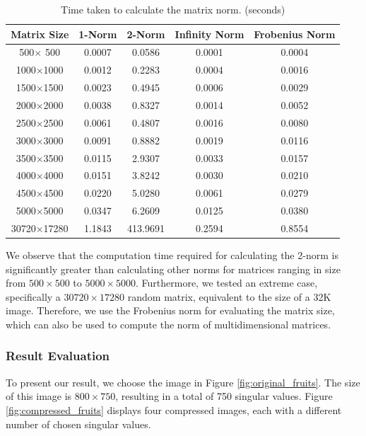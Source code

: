 \documentclass[12pt]{article}
\theoremstyle{definition}
\begin{document}
\begin{table}[ht]
    \centering
    \begin{tabular}{c@{\hspace{0.5cm}}||@{\hspace{0.4cm}}c@{\hspace{0.8cm}}c@{\hspace{0.5cm}}cc}
        \toprule
        Matrix Size & 1-Norm & 2-Norm & Infinity Norm & Frobenius Norm \\
        \midrule 
         500$\times$ 500 & 0.0007 & 0.0586 & 0.0001 & 0.0004 \\
        1000$\times$1000 & 0.0012 & 0.2283 & 0.0004 & 0.0016 \\
        1500$\times$1500 & 0.0023 & 0.4945 & 0.0006 & 0.0029 \\
        2000$\times$2000 & 0.0038 & 0.8327 & 0.0014 & 0.0052 \\
        2500$\times$2500 & 0.0061 & 0.4807 & 0.0016 & 0.0080 \\
        3000$\times$3000 & 0.0091 & 0.8882 & 0.0019 & 0.0116 \\
        3500$\times$3500 & 0.0115 & 2.9307 & 0.0033 & 0.0157 \\
        4000$\times$4000 & 0.0151 & 3.8242 & 0.0030 & 0.0210 \\
        4500$\times$4500 & 0.0220 & 5.0280 & 0.0061 & 0.0279 \\
        5000$\times$5000 & 0.0347 & 6.2609 & 0.0125 & 0.0380 \\
        30720$\times$17280 & 1.1843 & 413.9691 & 0.2594 & 0.8554 \\
        \bottomrule
    \end{tabular}
    \caption{Time taken to calculate the matrix norm. (seconds)}
    \label{table:1}
\end{table}

We observe that the computation time required for calculating the 2-norm is significantly greater than calculating other norms for matrices ranging in size from $500\times 500$ to $5000\times 5000$. Furthermore, we tested an extreme case, specifically a $30720 \times 17280$ random matrix, equivalent to the size of a 32K image. Therefore, we use the Frobenius norm for evaluating the matrix size, which can also be used to compute the norm of multidimensional matrices.

\subsubsection{Result Evaluation}
To present our result, we choose the image in Figure \ref{fig:original_fruits}. The size of this image is $800\times 750$, resulting in a total of 750 singular values. Figure \ref{fig:compressed_fruits} displays four compressed images, each with a different number of chosen singular values.
\end{document}
